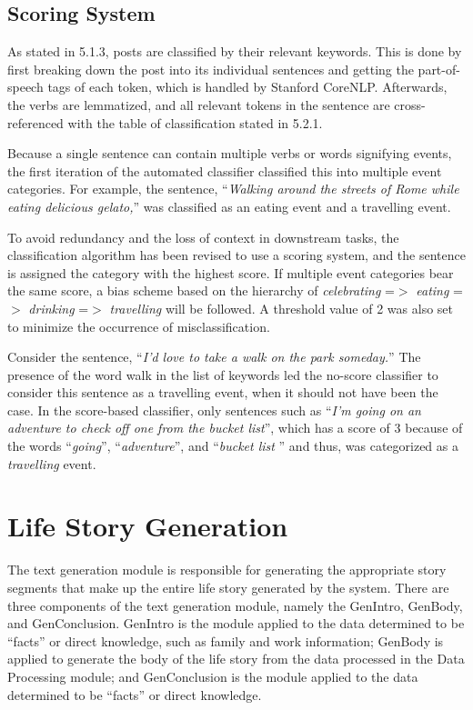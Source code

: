 \subsection{Scoring System}
As stated in 5.1.3, posts are classified by their relevant keywords. This is done by first breaking down the post into its individual sentences and getting the part-of-speech tags of each token, which is handled by Stanford CoreNLP. Afterwards, the verbs are lemmatized, and all relevant tokens in the sentence are cross-referenced with the table of classification stated in 5.2.1.

Because a single sentence can contain multiple verbs or words signifying events, the first iteration of the automated classifier classified this into multiple event categories. For example, the sentence, ``\textit{Walking around the streets of Rome while eating delicious gelato,}” was classified as an eating event and a travelling event. 

To avoid redundancy and the loss of context in downstream tasks, the classification algorithm has been revised to use a scoring system, and the sentence is assigned the category with the highest score. If multiple event categories bear the same score, a bias scheme based on the hierarchy of \textit{celebrating} =$>$ \textit{eating} =$>$ \textit{drinking} =$>$ \textit{travelling} will be followed. A threshold value of 2 was also set to minimize the occurrence of misclassification. 

Consider the sentence, ``\textit{I’d love to take a walk on the park someday.}” The presence of the word walk in the list of keywords led the no-score classifier to consider this sentence as a travelling event, when it should not have been the case. In the score-based classifier, only sentences such as ``\textit{I’m going on an adventure to check off one from the bucket list}”, which has a score of 3 because of the words ``\textit{going}”, ``\textit{adventure}”, and ``\textit{bucket list}	” and thus, was categorized as a \textit{travelling} event.

\section{Life Story Generation}
The text generation module is responsible for generating the appropriate story segments that make up the entire life story generated by the system. There are three components of the text generation module, namely the GenIntro, GenBody, and GenConclusion. GenIntro is the module applied to the data determined to be “facts” or direct knowledge, such as family and work information; GenBody is applied to generate the body of the life story from the data processed in the Data Processing module; and GenConclusion is the module applied to the data determined to be “facts” or direct knowledge.


